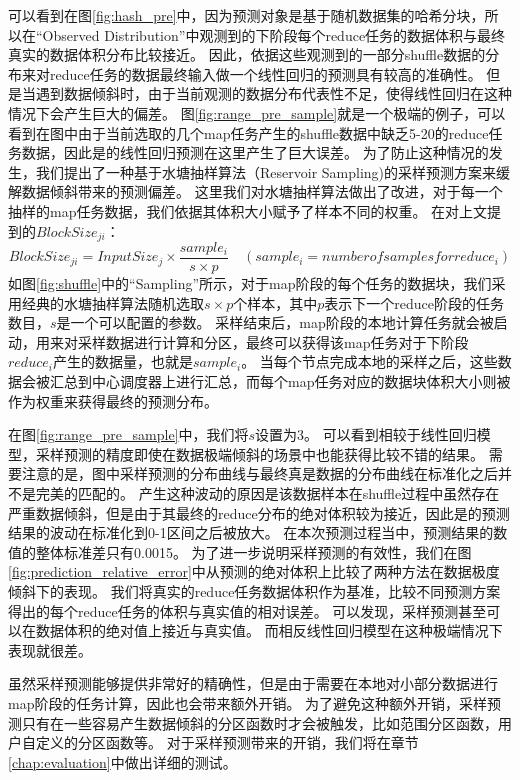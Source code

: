 可以看到在图\ref{fig:hash_pre}中，因为预测对象是基于随机数据集的哈希分块，所以在“Observed Distribution”中观测到的下阶段每个reduce任务的数据体积与最终真实的数据体积分布比较接近。
因此，依据这些观测到的一部分shuffle数据的分布来对reduce任务的数据最终输入做一个线性回归的预测具有较高的准确性。
但是当遇到数据倾斜时，由于当前观测的数据分布代表性不足，使得线性回归在这种情况下会产生巨大的偏差。
图\ref{fig:range_pre_sample}就是一个极端的例子，可以看到在图中由于当前选取的几个map任务产生的shuffle数据中缺乏5-20的reduce任务数据，因此是的线性回归预测在这里产生了巨大误差。
为了防止这种情况的发生，我们提出了一种基于水塘抽样算法（Reservoir Sampling)\cite{reservoir}的采样预测方案来缓解数据倾斜带来的预测偏差。
这里我们对水塘抽样算法做出了改进，对于每一个抽样的map任务数据，我们依据其体积大小赋予了样本不同的权重。
在对上文提到的$BlockSize_{ji}$：
\begin{equation}
	\label{eq:sample}
	BlockSize_{ji} = {{InputSize_j \times \frac{sample_i}{s \times p}}} \quad (sample_i = number of samples for reduce_i)
\end{equation}
如图\ref{fig:shuffle}中的“Sampling”所示，对于map阶段的每个任务的数据块，我们采用经典的水塘抽样算法随机选取$s \times p$个样本，其中$p$表示下一个reduce阶段的任务数目，$s$是一个可以配置的参数。
采样结束后，map阶段的本地计算任务就会被启动，用来对采样数据进行计算和分区，最终可以获得该map任务对于下阶段$reduce_i$产生的数据量，也就是$sample_i$。
当每个节点完成本地的采样之后，这些数据会被汇总到中心调度器上进行汇总，而每个map任务对应的数据块体积大小则被作为权重来获得最终的预测分布。

在图\ref{fig:range_pre_sample}中，我们将$s$设置为3。
可以看到相较于线性回归模型，采样预测的精度即使在数据极端倾斜的场景中也能获得比较不错的结果。
需要注意的是，图中采样预测的分布曲线与最终真是数据的分布曲线在标准化之后并不是完美的匹配的。
产生这种波动的原因是该数据样本在shuffle过程中虽然存在严重数据倾斜，但是由于其最终的reduce分布的绝对体积较为接近，因此是的预测结果的波动在标准化到0-1区间之后被放大。
在本次预测过程当中，预测结果的数值的整体标准差只有0.0015。
为了进一步说明采样预测的有效性，我们在图\ref{fig:prediction_relative_error}中从预测的绝对体积上比较了两种方法在数据极度倾斜下的表现。
我们将真实的reduce任务数据体积作为基准，比较不同预测方案得出的每个reduce任务的体积与真实值的相对误差。
可以发现，采样预测甚至可以在数据体积的绝对值上接近与真实值。
而相反线性回归模型在这种极端情况下表现就很差。

虽然采样预测能够提供非常好的精确性，但是由于需要在本地对小部分数据进行map阶段的任务计算，因此也会带来额外开销。
为了避免这种额外开销，采样预测只有在一些容易产生数据倾斜的分区函数时才会被触发，比如范围分区函数，用户自定义的分区函数等。
对于采样预测带来的开销，我们将在章节\ref{chap:evaluation}中做出详细的测试。

